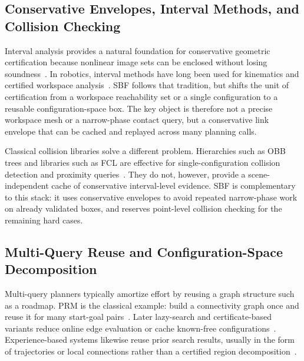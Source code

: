 \documentclass[journal]{IEEEtran}
\begin{document}
\subsection{Conservative Envelopes, Interval Methods, and Collision Checking}

Interval analysis provides a natural foundation for conservative geometric
certification because nonlinear image sets can be enclosed without losing
soundness~\cite{moore2009introduction,jaulin2001applied}. In robotics, interval
methods have long been used for kinematics and certified workspace
analysis~\cite{merlet2004solving,merlet2006interval}. SBF follows that
tradition, but shifts the unit of certification from a workspace reachability
set or a single configuration to a reusable configuration-space box. The key
object is therefore not a precise workspace mesh or a narrow-phase contact
query, but a conservative link envelope that can be cached and replayed across
many planning calls.

Classical collision libraries solve a different problem. Hierarchies such as
OBB trees and libraries such as FCL are effective for single-configuration
collision detection and proximity queries~\cite{gottschalk1996obbtree,
pan2012fcl,gilbert1988fast}. They do not, however, provide a scene-independent
cache of conservative interval-level evidence. SBF is complementary to this stack:
it uses conservative envelopes to avoid repeated narrow-phase work on already
validated boxes, and reserves point-level collision checking for the remaining
hard cases.

\subsection{Multi-Query Reuse and Configuration-Space Decomposition}

Multi-query planners typically amortize effort by reusing a graph structure such
as a roadmap. PRM is the classical example: build a connectivity graph once and
reuse it for many start-goal pairs~\cite{kavraki1996probabilistic,
bohlin2000path}. Later lazy-search and certificate-based variants reduce online
edge evaluation or cache known-free configurations~\cite{dellin2016unifying,
schmerling2015optimal}. Experience-based systems likewise reuse prior search
results, usually in the form of trajectories or local connections rather than a
certified region decomposition~\cite{coleman2014moveit}.
\end{document}
